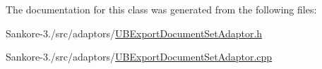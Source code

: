 The documentation for this class was generated from the following files\-:\begin{DoxyCompactItemize}
\item 
Sankore-\/3./src/adaptors/\hyperlink{_u_b_export_document_set_adaptor_8h}{U\-B\-Export\-Document\-Set\-Adaptor.\-h}\item 
Sankore-\/3./src/adaptors/\hyperlink{_u_b_export_document_set_adaptor_8cpp}{U\-B\-Export\-Document\-Set\-Adaptor.\-cpp}\end{DoxyCompactItemize}
